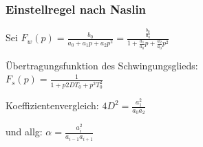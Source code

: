 \subsubsection{Einstellregel nach Naslin}
\begin{minipage}{0.45\textwidth}
Sei $F_w(p) = \frac{b_0}{a_0+a_1p+a_2p^2} = \frac{\frac{b_0}{a_0}}{1+\frac{a_1}{a_0}p+\frac{a_2}{a_0}p^2}$

Übertragungsfunktion des Schwingungsglieds: \\
$F_s(p)= \frac{1}{1+p2DT_0 + p^2T_0^2}$

Koeffizientenvergleich:
$4D^2 = \frac{a_1^2}{a_0a_2}$

und allg:
$\alpha = \frac{a_i^2}{a_{i-1} a_{i+1}}$


\end{minipage}
\begin{minipage}{0.45\textwidth}
\end{minipage}
